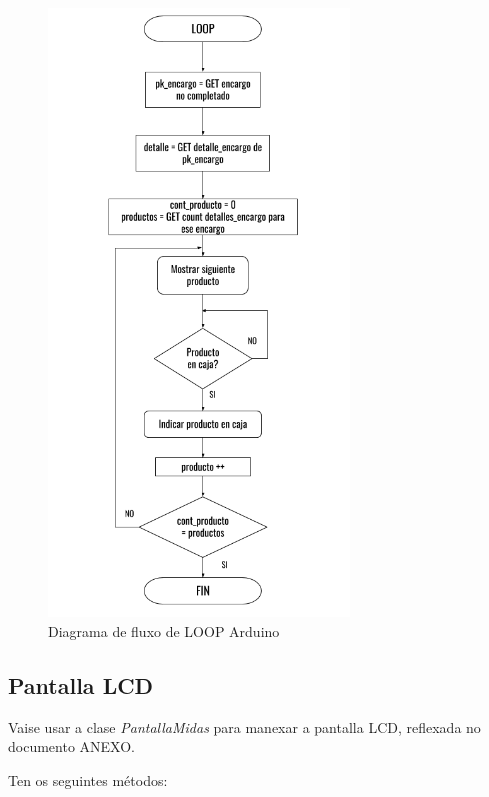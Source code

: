 \documentclass[11pt,twoside]{book}
\begin{document}
\begin{figure}[H]
	\begin{center}
		\includegraphics[width=8cm]{images/diagrama_flujo_loop.png}
	\end{center}
	\caption{Diagrama de fluxo de LOOP Arduino}
	\label{fig:FluxoLOOP}
\end{figure}
 
 \subsection{Pantalla LCD}

Vaise usar a clase \textit{PantallaMidas} para manexar a pantalla LCD, reflexada no documento ANEXO. 

Ten os seguintes métodos:
\end{document}
